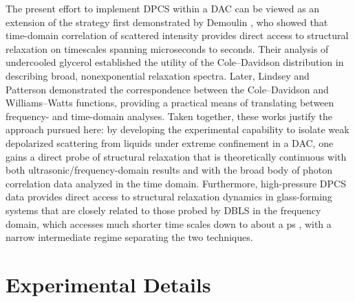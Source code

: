 The present effort to implement DPCS within a DAC can be viewed as an extension of the strategy first demonstrated by Demoulin \etal, who showed that time-domain correlation of scattered intensity provides direct access to structural relaxation on timescales spanning microseconds to seconds\nolinebreak\cite{Demoulin}. Their analysis of undercooled glycerol established the utility of the Cole--Davidson distribution in describing broad, nonexponential relaxation spectra. Later, Lindsey and Patterson demonstrated the correspondence between the Cole--Davidson and Williams--Watts functions, providing a practical means of translating between frequency- and time-domain analyses\nolinebreak\cite{Lindsey}. Taken together, these works justify the approach pursued here: by developing the experimental capability to isolate weak depolarized scattering from liquids under extreme confinement in a DAC, one gains a direct probe of structural relaxation that is theoretically continuous with both ultrasonic/frequency-domain results and with the broad body of photon correlation data analyzed in the time domain. Furthermore, high-pressure DPCS data provides direct access to structural relaxation dynamics in glass-forming systems that are closely related to those probed by DBLS in the frequency domain, which accesses much shorter time scales down to about a ps \cite{47,119}, with a narrow intermediate regime separating the two techniques.
\graphicspath{{Chapters/PCS/Figures/}}

\section{Experimental Details}\label{sec:PCSExp}

